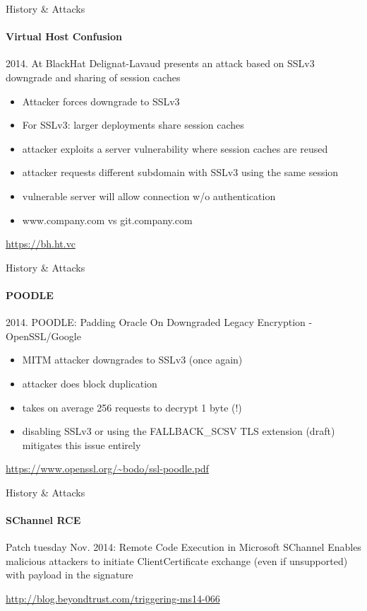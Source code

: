 \documentclass[hyperref={draft}]{beamer}
\begin{document}
\begin{frame}{History \& Attacks}
  \framesubtitle{Virtual Host Confusion}
  2014. At BlackHat Delignat-Lavaud presents an attack based on SSLv3 downgrade and sharing of session caches
  \begin{itemize}
    \item Attacker forces downgrade to SSLv3
    \item For SSLv3: larger deployments share session caches
    \item attacker exploits a server vulnerability where session caches are reused
    \item attacker requests different subdomain with SSLv3 using the same session
    \item vulnerable server will allow connection w/o authentication
    \item www.company.com vs git.company.com
  \end{itemize}

  \vspace{15px}

  \tiny
  \url{https://bh.ht.vc}
\end{frame}

\begin{frame}{History \& Attacks}
  \framesubtitle{POODLE}
  2014. POODLE: Padding Oracle On Downgraded Legacy Encryption - OpenSSL/Google
  \begin{itemize}
    \item MITM attacker downgrades to SSLv3 (once again)
    \item attacker does block duplication
    \item takes on average 256 requests to decrypt 1 byte (!)
    \item disabling SSLv3 or using the FALLBACK\_SCSV TLS extension (draft) mitigates this issue entirely
  \end{itemize}

  \vspace{15px}

  \tiny
  \url{https://www.openssl.org/~bodo/ssl-poodle.pdf}
\end{frame}

\begin{frame}{History \& Attacks}
  \framesubtitle{SChannel RCE}
  Patch tuesday Nov. 2014: Remote Code Execution in Microsoft SChannel
  \newline
  \newline
  Enables malicious attackers to initiate ClientCertificate exchange (even if unsupported) with payload in the signature
  
  \vspace{20px}

  \tiny
  \url{http://blog.beyondtrust.com/triggering-ms14-066}

\end{frame}
\end{document}
